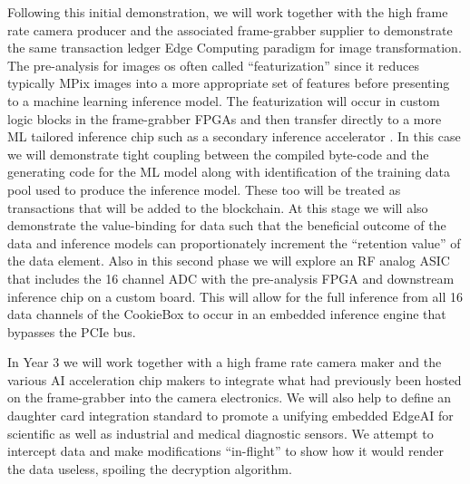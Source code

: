 \documentclass{article}
\begin{document}
Following this initial demonstration, we will work together with the high frame rate camera producer and the associated frame-grabber supplier to demonstrate the same transaction ledger Edge Computing paradigm for image transformation.
The pre-analysis for images os often called ``featurization'' since it reduces typically MPix images into a more appropriate set of features before presenting to a machine learning inference model.
The featurization will occur in custom logic blocks in the frame-grabber FPGAs and then transfer directly to a more ML tailored inference chip such as a secondary inference accelerator \cite{waveCGRA,CGRAreview,seaofcores}.
In this case we will demonstrate tight coupling between the compiled byte-code and the generating code for the ML model along with identification of the training data pool used to produce the inference model.
These too will be treated as transactions that will be added to the blockchain.
At this stage we will also demonstrate the value-binding for data such that the beneficial outcome of the data and inference models can proportionately increment the ``retention value'' of the data element.
Also in this second phase we will explore an RF analog ASIC that includes the 16 channel ADC with the pre-analysis FPGA and downstream inference chip on a custom board.
This will allow for the full inference from all 16 data channels of the CookieBox to occur in an embedded inference engine that bypasses the PCIe bus.

In Year 3 we will work together with a high frame rate camera maker and the various AI acceleration chip makers to integrate what had previously been hosted on the frame-grabber into the camera electronics.
We will also help to define an daughter card integration standard to promote a unifying embedded EdgeAI for scientific as well as industrial and medical diagnostic sensors.
We attempt to intercept data and make modifications ``in-flight'' to show how it would render the data useless, spoiling the decryption algorithm.
\end{document}
